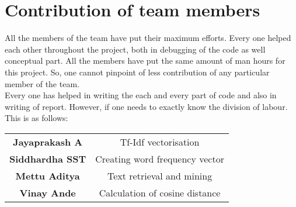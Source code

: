 \section{Contribution of team members}

All the  members of the team have put their maximum efforts. Every one helped each other throughout the project, both in debugging of the code as well conceptual part. All the members have put the same amount of man hours for this project. So, one cannot pinpoint of less contribution of any particular member of the team.\\
\indent Every one has helped in writing the each and every part of code and also in writing of report. However, if one needs to exactly know the division of labour. This is as follows:\\


\begin{center}
	\begin{tabular}{ c c  }
		\textbf{Jayaprakash A} &  Tf-Idf vectorisation  \\ 
		\textbf{Siddhardha SST} & Creating word frequency vector\\  
		\textbf{Mettu Aditya} &  Text retrieval and mining\\
		 \textbf{Vinay Ande} &   Calculation of cosine distance\\
	\end{tabular}
\end{center}


